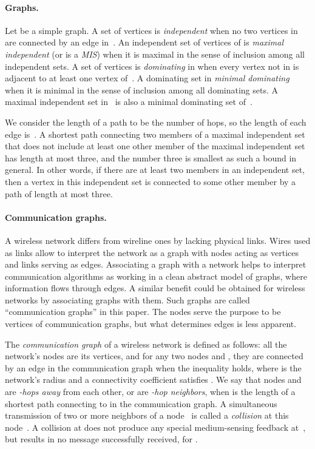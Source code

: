 \documentclass[11pt]{article}
\newcommand{\BBB}{\vspace*{-\bigskipamount}}
\newcommand{\Paragraph}[1]{\BBB\paragraph{#1}}
\begin{document}
\Paragraph{Graphs.} 


Let  be a simple graph.
A set of vertices   is \emph{independent} when no two vertices in  are connected by an edge in~.
An independent set of vertices of  is \emph{maximal independent} (or is a \emph{MIS}) when it is maximal in the sense of inclusion among all independent sets.
A set of vertices  is \emph{dominating} in  when every vertex not in  is adjacent to at least one vertex of~.
A dominating set in \emph{minimal dominating} when it is minimal in the sense of inclusion among all dominating sets.
A maximal independent set in~ is also a minimal dominating set of~.

We consider the length of a path to be the number of hops, so the length of each edge is~.
A shortest path connecting two members of a maximal independent set that does not include at least one other member of the maximal independent set has length at most three, and the number three is smallest  as such a bound in general.
In other words, if there are at least two members in an independent  set, then a vertex in this independent set is connected to some other member by a path of length at most three.




\Paragraph{Communication graphs.}



A wireless network differs from wireline ones by lacking physical links.
Wires used as links allow to interpret the network as a graph with nodes acting as vertices and links serving as edges.
Associating a graph with a network helps to interpret communication algorithms as working in a clean abstract model of graphs, where information flows through edges.
A similar benefit could be obtained for wireless networks by associating graphs with them.
Such graphs are called ``communication graphs'' in this paper.
The nodes serve the purpose to be vertices of communication graphs, but what determines edges is less apparent.


The \emph{communication graph} of a wireless network is defined as follows: all the network's nodes are its vertices, and  for any two nodes  and , they are connected by an edge in the communication graph when the inequality  holds, where  is the network's radius and a connectivity coefficient  satisfies .
We say that nodes  and  are \emph{-hops away} from each other, or are \emph{-hop neighbors}, when  is the length of a shortest path connecting  to  in the communication graph.
A simultaneous transmission of two or more neighbors of a node~ is called a {\em collision} at this node~.
A collision at  does not produce any special medium-sensing feedback at~, but results in no message successfully received, for .
\end{document}
